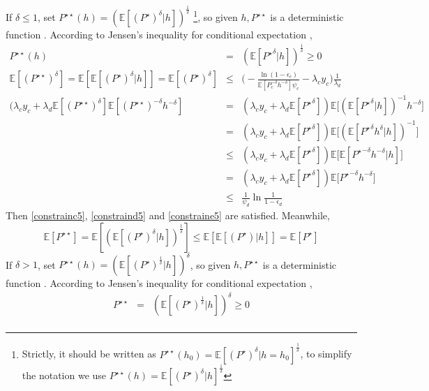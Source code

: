 \documentclass[12pt, draftclsnofoot, journal, letterpaper, onecolumn]{IEEEtran}
\begin{document}
\begin{IEEEproof}
If $\delta\leq1$, set $P^{\star\star}(h)=(\mathbb{E}[(P^{\star})^{\delta}|h])^{\frac{1}{\delta}}$  \footnote{Strictly, it should be written as $P^{\star\star}(h_0)=\mathbb{E}[(P^{\star})^{\delta}|h=h_0]^{\frac{1}{\delta}}$, to simplify the notation we use $P^{\star\star}(h)=\mathbb{E}[(P^{\star})^{\delta}|h]^{\frac{1}{\delta}}$}, so given $h,P^{\star\star}$ is a deterministic function \cite{probabilityross}. According to Jensen's inequality for conditional expectation \cite{probability},
\begin{eqnarray*}
P^{\star\star}(h)&=&(\mathbb{E}[{P^{\star}}^{\delta}|h])^{\frac{1}{\delta}}\geq0\\
\mathbb{E}[(P^{\star\star})^\delta]=\mathbb{E}[\mathbb{E}[(P^{\star})^{\delta}|h]]=\mathbb{E}[(P^{\star})^\delta]&\leq& \bigg(-\frac{\ln(1-\epsilon_c)}{\mathbb{E}[P_c^{-\delta}h^{-\delta}]\psi_c}-\lambda_cy_c\bigg)\frac{1}{\lambda_d}\\
(\lambda_cy_c+\lambda_d\mathbb{E}[{({P^{\star\star}})^\delta}]\mathbb{E}[({P^{\star\star}})^{-\delta}h^{-\delta}]
&=&(\lambda_cy_c+\lambda_d\mathbb{E}[{{P^{\star}}^\delta}])\mathbb{E}\big[(\mathbb{E}[{P^\star}^\delta|h])^{-1}h^{-\delta}\big]\\
&=&(\lambda_cy_c+\lambda_d\mathbb{E}[{{P^{\star}}^\delta}])\mathbb{E}\big[(\mathbb{E}[{P^\star}^\delta h^{\delta}|h])^{-1}\big]\\
&\leq&(\lambda_cy_c+\lambda_d\mathbb{E}[{{P^{\star}}^\delta}])\mathbb{E}\big[\mathbb{E}[{P^\star}^{-\delta}h^{-\delta}|h]\big]\\
&=&(\lambda_cy_c+\lambda_d\mathbb{E}[{{P^{\star}}^\delta}])\mathbb{E}\big[{P^\star}^{-\delta}h^{-\delta}\big]\\
&\leq&\frac{1}{\psi_d}\ln\frac{1}{1-\epsilon_d}
\end{eqnarray*}
Then \eqref{constrainc5}, \eqref{constraind5} and \eqref{constraine5} are satisfied.
Meanwhile,
\begin{equation*}
\mathbb{E}[P^{\star\star}]=\mathbb{E}[(\mathbb{E}[(P^{\star})^{\delta}|h])^{\frac{1}{\delta}}]\leq\mathbb{E}[\mathbb{E}[(P^{\star})|h]]=\mathbb{E}[P^{\star}]
\end{equation*}
If $\delta>1$, set $P^{\star\star}(h)=(\mathbb{E}[(P^{\star})^{\frac{1}{\delta}}|h])^{\delta}$, so given $h,P^{\star\star}$ is a deterministic function \cite{probabilityross}. According to Jensen's inequality for conditional expectation \cite{probability},
\begin{eqnarray*}
P^{\star\star}&=&(\mathbb{E}[(P^{\star})^{\frac{1}{\delta}}|h])^{\delta}\geq0\\

\end{eqnarray*}
\end{IEEEproof}
\end{document}

